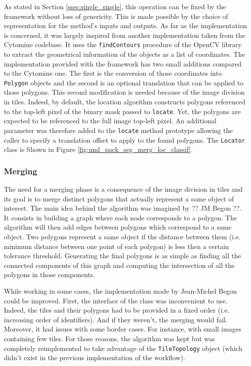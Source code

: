 As stated in Section \ref{ssec:single_single}, this operation can be fixed by the framework without loss of genericity. This is made possible by the choice of representation for the method's inputs and outputs. As far as the implementation is concerned, it was largely inspired from another implementation taken from the Cytomine codebase. It uses the \texttt{findContours} procedure of the OpenCV library to extract the geometrical information of the objects as a list of coordinates. The implementation provided with the framework has two small additions compared to the Cytomine one. The first is the conversion of those coordinates into \texttt{Polygon} objects and the second is an optional translation that can be applied to those polygons. This second modification is needed because of the image division in tiles. Indeed, by default, the location algorithm constructs polygons referenced to the top-left pixel of the binary mask passed to \texttt{locate}. Yet, the polygons are expected to be referenced to the full image top-left pixel. An additional parameter was therefore added to the \texttt{locate} method prototype allowing the caller to specify a translation offset to apply to the found polygons. The \texttt{Locator} class is Shown in Figure \ref{fig:uml_pack_seg_merg_loc_classif}.

\subsubsection{Merging}
\label{sssec:merging}
The need for a merging phase is a consequence of the image division in tiles and its goal is to merge distinct polygons that actually represent a same object of interest. The main idea behind the algorithm was imagined by ?? JM Begon ??. It consists in building a graph where each node corresponds to a polygon. The algorithm will then add edges between polygons which correspond to a same object. Two polygons represent a same object if the distance between them (i.e. minimum distance between one point of each polygon) is less then a certain tolerance threshold. Generating the final polygons is as simple as finding all the connected components of this graph and computing the intersection of all the polygons in those components. 

While working in some cases, the implementation made by Jean-Michel Begon could be improved. First, the interface of the class was inconvenient to use. Indeed, the tiles and their polygons had to be provided in a fixed order (i.e. increasing order of identifiers). And if they weren't, the merging would fail. Moreover, it had issues with some border cases. For instance, with small images containing few tiles. For those reasons, the algorithm was kept but was completely reimplemented to take advantage of the \texttt{TileTopology} object (which didn't exist in the previous implementation of the workflow). 

